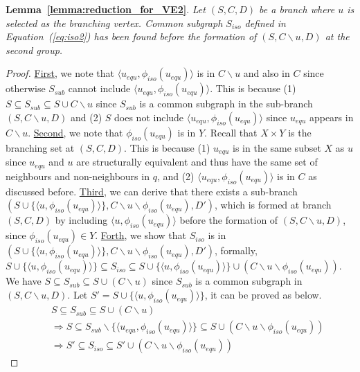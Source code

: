 \smallskip
\noindent\textbf{Lemma~\ref{lemma:reduction_for_VE2}}. \emph{Let $(S,C,D)$ be a branch where $u$ is selected as the branching vertex. Common subgraph $S_{iso}$ {\chengC defined in} Equation~(\ref{eq:iso2}) has been found before the formation of $(S,C\backslash u,D)$ at the second group.  }
\begin{proof}
    \underline{First}, we note that $\langle u_{equ},\phi_{iso}(u_{equ}) \rangle$ is in $C\backslash u$ and also in $C$ since otherwise $S_{sub}$ cannot include $\langle u_{equ},\phi_{iso}(u_{equ}) \rangle$. This is because (1) $S\subseteq S_{sub}\subseteq S\cup C\backslash u$ since $S_{sub}$ is a common subgraph in the sub-branch $(S,C\backslash u,D)$ and (2) $S$ does not include $\langle u_{equ},\phi_{iso}(u_{equ}) \rangle$ since $u_{equ}$ appears in $C\backslash u$.
    \underline{Second}, we note that $\phi_{iso}(u_{equ})$ is in $Y$. Recall that $X\times Y$ is the branching set at $(S,C,D)$. This is because (1) $u_{equ}$ is in the same subset $X$ as $u$ since $u_{equ}$ and $u$ are structurally equivalent and thus have the same set of neighbours and non-neighbours in $q$, and (2) $\langle u_{equ},\phi_{iso}(u_{equ}) \rangle$ is in $C$ as discussed before.
    \underline{Third}, we can derive that there exists a sub-branch $(S\cup \{\langle u,\phi_{iso}(u_{equ}) \rangle\},C\backslash u\backslash \phi_{iso}(u_{equ}),D')$, which is formed at branch $(S,C,D)$  by including $\langle u,\phi_{iso}(u_{equ}) \rangle$ before the formation of $(S,C\backslash u,D)$, since $\phi_{iso}(u_{equ})\in Y$.
    \underline{Forth}, we show that $S_{iso}$ is in $(S\cup \{\langle u,\phi_{iso}(u_{equ}) \rangle\},C\backslash u\backslash \phi_{iso}(u_{equ}),D')$, formally, $S\cup \{\langle u,\phi_{iso}(u_{equ}) \rangle\} \subseteq S_{iso}\subseteq S\cup \{\langle u,\phi_{iso}(u_{equ}) \rangle\}\cup (C\backslash u\backslash \phi_{iso}(u_{equ}))$.
    We have $S\subseteq S_{sub}\subseteq S\cup (C\backslash u)$ since $S_{sub}$ is a common subgraph in $(S,C\backslash u,D)$. Let $S'=S\cup \{\langle u,\phi_{iso}(u_{equ}) \rangle\}$, it can be proved as below.
    \begin{eqnarray}
        && S\subseteq S_{sub}\subseteq S\cup (C\backslash u)\\
        && \Rightarrow S\subseteq S_{sub}\backslash\{\langle u_{equ}, \phi_{iso}(u_{equ})\rangle\}\subseteq S\cup (C\backslash u\backslash \phi_{iso}(u_{equ})) \label{eq:llemma_eq_1}\\
        && \Rightarrow S' \subseteq S_{iso}\subseteq S'\cup (C\backslash u\backslash \phi_{iso}(u_{equ})) \label{eq:llemma_eq_2}

\end{eqnarray}
\end{proof}
